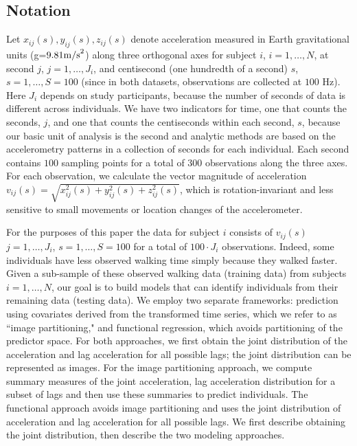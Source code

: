 \subsection{Notation}
Let $x_{ij}(s), y_{ij}(s), z_{ij}(s)$ denote acceleration measured in Earth gravitational units (g=$9.81 {\rm m/s}^2$) along three orthogonal axes for subject $i$, $i = 1, \dots, N$, at second $j$, $j = 1, \dots, J_i$, and centisecond (one hundredth of a second) $s$, $s = 1,\dots, S=100$ (since in both datasets, observations are collected at $100$ Hz). Here $J_i$ depends on study participants, because the number of seconds of data is different across individuals. We have two indicators for time, one that counts the seconds, $j$, and one that counts the centiseconds within each second, $s$, because our basic unit of analysis is the second and analytic methods are based on the accelerometry patterns in a collection of seconds for each individual. Each second contains $100$ sampling points for a total of $300$ observations along the three axes.  For each observation, we calculate the vector magnitude of acceleration $v_{ij}(s) = \sqrt{x^2_{ij}(s)+ y^2_{ij}(s) + z^2_{ij}(s)} $, which is rotation-invariant and less sensitive to small movements or location changes of the accelerometer. 


For the purposes of this paper the data for subject $i$ consists of $v_{ij}(s)$ $j=1, \ldots, J_i$, $s =1,\ldots,  S=100$ for a total of $100\cdot J_i$ observations.  Indeed, some individuals have less observed walking time simply because they walked faster. Given a sub-sample of these observed walking data (training data) from subjects $i = 1, \dots, N$, our goal is to build models that can identify individuals from their remaining data (testing data). We employ two separate frameworks: prediction using covariates derived from the transformed time series, which we refer to as ``image partitioning," and functional regression, which avoids partitioning of the predictor space. For both approaches, we first obtain the joint distribution of the acceleration and lag acceleration for all possible lags; the joint distribution can be represented as images. For the image partitioning approach, we compute summary measures of the joint acceleration, lag acceleration distribution for a subset of lags and then use these summaries to predict individuals. The functional approach avoids image partitioning and uses the joint distribution of acceleration and lag acceleration for all possible lags. We first describe obtaining the joint distribution, then describe the two modeling approaches. 

